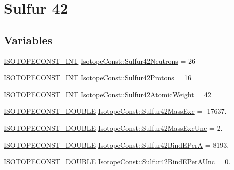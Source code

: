 \hypertarget{group___isotope_const-_sulfur-_s42}{}\section{Sulfur 42}
\label{group___isotope_const-_sulfur-_s42}
\subsection*{Variables}
\begin{DoxyCompactItemize}
\item 
\mbox{\hyperlink{group___isotope_const-_macros_ga5f18360b3e99483a35c32d789e62621c}{I\+S\+O\+T\+O\+P\+E\+C\+O\+N\+S\+T\+\_\+\+I\+NT}} \mbox{\hyperlink{group___isotope_const-_sulfur-_s42_gaa6a70401088b1e211543116a0ba7297a}{Isotope\+Const\+::\+Sulfur42\+Neutrons}} = 26
\item 
\mbox{\hyperlink{group___isotope_const-_macros_ga5f18360b3e99483a35c32d789e62621c}{I\+S\+O\+T\+O\+P\+E\+C\+O\+N\+S\+T\+\_\+\+I\+NT}} \mbox{\hyperlink{group___isotope_const-_sulfur-_s42_ga0502bc830abca83441de84edac7fb83a}{Isotope\+Const\+::\+Sulfur42\+Protons}} = 16
\item 
\mbox{\hyperlink{group___isotope_const-_macros_ga5f18360b3e99483a35c32d789e62621c}{I\+S\+O\+T\+O\+P\+E\+C\+O\+N\+S\+T\+\_\+\+I\+NT}} \mbox{\hyperlink{group___isotope_const-_sulfur-_s42_gaf565f6e05edec8cb38673b15e2550c36}{Isotope\+Const\+::\+Sulfur42\+Atomic\+Weight}} = 42
\item 
\mbox{\hyperlink{group___isotope_const-_macros_ga8f45a7272ce02c0b4c65c44636ed719a}{I\+S\+O\+T\+O\+P\+E\+C\+O\+N\+S\+T\+\_\+\+D\+O\+U\+B\+LE}} \mbox{\hyperlink{group___isotope_const-_sulfur-_s42_ga27e692a106007ea6f61efeb952f3611f}{Isotope\+Const\+::\+Sulfur42\+Mass\+Exc}} = -\/17637.
\item 
\mbox{\hyperlink{group___isotope_const-_macros_ga8f45a7272ce02c0b4c65c44636ed719a}{I\+S\+O\+T\+O\+P\+E\+C\+O\+N\+S\+T\+\_\+\+D\+O\+U\+B\+LE}} \mbox{\hyperlink{group___isotope_const-_sulfur-_s42_gaca945c2c9af5cfd4b0e7b8a17bcf7435}{Isotope\+Const\+::\+Sulfur42\+Mass\+Exc\+Unc}} = 2.
\item 
\mbox{\hyperlink{group___isotope_const-_macros_ga8f45a7272ce02c0b4c65c44636ed719a}{I\+S\+O\+T\+O\+P\+E\+C\+O\+N\+S\+T\+\_\+\+D\+O\+U\+B\+LE}} \mbox{\hyperlink{group___isotope_const-_sulfur-_s42_gad1da047158b4a56fbb4eca7e886fed0d}{Isotope\+Const\+::\+Sulfur42\+Bind\+E\+PerA}} = 8193.
\item 
\mbox{\hyperlink{group___isotope_const-_macros_ga8f45a7272ce02c0b4c65c44636ed719a}{I\+S\+O\+T\+O\+P\+E\+C\+O\+N\+S\+T\+\_\+\+D\+O\+U\+B\+LE}} \mbox{\hyperlink{group___isotope_const-_sulfur-_s42_ga250449377f39072bf1a6a9a064ed2bf6}{Isotope\+Const\+::\+Sulfur42\+Bind\+E\+Per\+A\+Unc}} = 0.

\end{DoxyCompactItemize}
